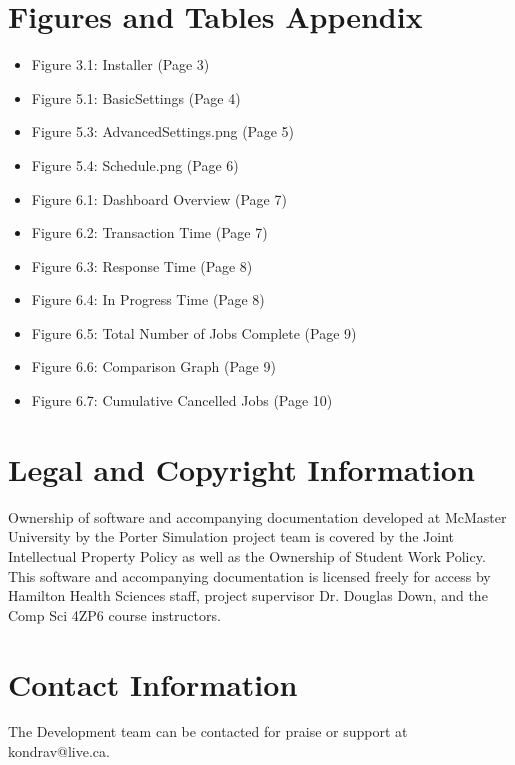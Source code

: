 \documentclass[paper=letter, fontsize=10pt]{scrartcl}
\numberwithin{equation}{section}		%
\numberwithin{figure}{section}			%
\numberwithin{table}{section}				%
\begin{document}
\section{Figures and Tables Appendix}
\begin{itemize}
	\item Figure 3.1: Installer (Page 3)
	\item Figure 5.1: BasicSettings (Page 4)
	\item Figure 5.3: AdvancedSettings.png (Page 5)
	\item Figure 5.4: Schedule.png (Page 6)
	\item Figure 6.1: Dashboard Overview (Page 7)
	\item Figure 6.2: Transaction Time (Page 7)
	\item Figure 6.3: Response Time (Page 8)
	\item Figure 6.4: In Progress Time (Page 8)
	\item Figure 6.5: Total Number of Jobs Complete (Page 9)
	\item Figure 6.6: Comparison Graph (Page 9)
	\item Figure 6.7: Cumulative Cancelled Jobs (Page 10)
\end{itemize}

\section{Legal and Copyright Information}
Ownership of software and accompanying documentation developed at McMaster University by the Porter Simulation project team is covered by the Joint Intellectual Property Policy as well as the Ownership of Student Work Policy. This software and accompanying documentation is licensed freely for access by Hamilton Health Sciences staff, project supervisor Dr. Douglas Down, and the Comp Sci 4ZP6 course instructors.

\section{Contact Information}
The Development team can be contacted for praise or support at kondrav@live.ca.



\end{document}

